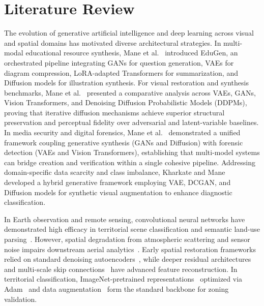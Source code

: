 \documentclass[conference]{IEEEtran}
\begin{document}
\section{Literature Review}
The evolution of generative artificial intelligence and deep learning across visual and spatial domains has motivated diverse architectural strategies. In multi-modal educational resource synthesis, Mane et al.~\cite{mane2026edugen} introduced EduGen, an orchestrated pipeline integrating GANs for question generation, VAEs for diagram compression, LoRA-adapted Transformers for summarization, and Diffusion models for illustration synthesis. For visual restoration and synthesis benchmarks, Mane et al.~\cite{mane2026colorization} presented a comparative analysis across VAEs, GANs, Vision Transformers, and Denoising Diffusion Probabilistic Models (DDPMs), proving that iterative diffusion mechanisms achieve superior structural preservation and perceptual fidelity over adversarial and latent-variable baselines. In media security and digital forensics, Mane et al.~\cite{mane2026unified} demonstrated a unified framework coupling generative synthesis (GANs and Diffusion) with forensic detection (VAEs and Vision Transformers), establishing that multi-model systems can bridge creation and verification within a single cohesive pipeline. Addressing domain-specific data scarcity and class imbalance, Kharkate and Mane~\cite{kharkate2026skin} developed a hybrid generative framework employing VAE, DCGAN, and Diffusion models for synthetic visual augmentation to enhance diagnostic classification.

In Earth observation and remote sensing, convolutional neural networks have demonstrated high efficacy in territorial scene classification and semantic land-use parsing~\cite{cheng2017remote,yang2010bag,long2015fully}. However, spatial degradation from atmospheric scattering and sensor noise impairs downstream aerial analytics~\cite{tuia2016domain}. Early spatial restoration frameworks relied on standard denoising autoencoders~\cite{vincent2008extracting}, while deeper residual architectures~\cite{he2016deep} and multi-scale skip connections~\cite{ronneberger2015u,zhang2017beyond} have advanced feature reconstruction. In territorial classification, ImageNet-pretrained representations~\cite{krizhevsky2012imagenet} optimized via Adam~\cite{kingma2014adam} and data augmentation~\cite{perez2017effectiveness} form the standard backbone for zoning validation.
\end{document}
